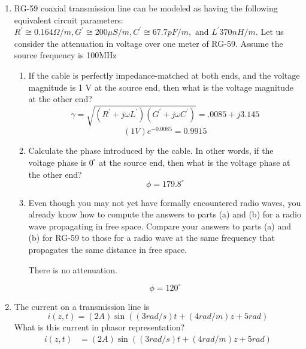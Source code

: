 \documentclass{article}
\begin{document}
\begin{enumerate}
   \item RG-59 coaxial transmission line can be modeled as having the following equivalent circuit parameters: $R^{'} \cong 0.164 \Omega/m, G^{'} \cong 200 \mu S/m, C^{'} \cong 67.7pF/m,\text{ and }L^{'} 370 nH/m.$ Let us consider the attenuation in voltage over one meter of RG-59. Assume the source frequency is 100MHz
   \begin{enumerate}
   \item If the cable is perfectly impedance-matched at both ends, and the voltage magnitude is 1 V at the source end, then what is the voltage magnitude at the other end?
   \begin{equation}
       \gamma= \sqrt{(R^{'}+j\omega L^{'})(G^{'}+j\omega C^{'})} = .0085 + j3.145
   \end{equation}
   \begin{equation}
       (1V)e^{-0.0085} = \boxed{0.9915}
   \end{equation}
   \item  Calculate the phase introduced by the cable. In other words, if the voltage phase is $0^\circ$ at the source end, then what is the voltage phase at the other end?
   \begin{equation}
       \phi = \boxed{179.8^\circ}
   \end{equation}
   \item Even though you may not yet have formally encountered radio waves, you already know how to compute the answers to parts (a) and (b) for a radio wave propagating in free space. Compare your answers to parts (a) and (b) for RG-59 to those for a radio wave at the same frequency that propagates the same distance in free space.
   \begin{center}
       There is no attenuation.
   \end{center}
   \begin{equation}
       \phi = \boxed{120^\circ}
   \end{equation}
   \end{enumerate}
   \item The current on a transmission line is 
   \begin{equation}
       i(z,t) = (2A)\sin((3rad/s)t + (4rad/m)z+5rad)
   \end{equation}
   What is this current in phasor representation?
   \begin{align}
       i(z,t) &= (2A)\sin((3rad/s)t + (4rad/m)z+5rad)\\

\end{align}
\end{enumerate}
\end{document}
